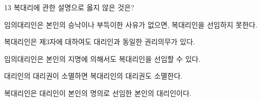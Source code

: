 \begin{question}{13}
복대리에 관한 설명으로 옳지 않은 것은?
\begin{choices}
  \item 임의대리인은 본인의 승낙이나 부득이한 사유가 없으면, 복대리인을 선임하지 못한다.
  \item 복대리인은 제3자에 대하여도 대리인과 동일한 권리의무가 있다.
  \item 임의대리인은 본인의 지명에 의해서도 복대리인을 선임할 수 있다.
  \item 대리인의 대리권이 소멸하면 복대리인의 대리권도 소멸한다.
  \item 복대리인은 대리인이 본인의 명의로 선임한 본인의 대리인이다.
\end{choices}
\end{question}
